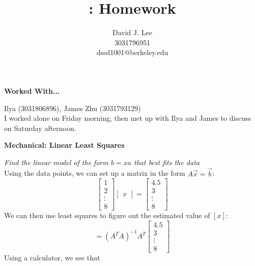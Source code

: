 \documentclass[letter]{article}
\title{\class: Homework \hwn}
\author{David J. Lee\\3031796951\\dssd1001@berkeley.edu}
\newenvironment{menumerate}{\edef\backupindent{\the\parindent}
  \enumerate\setlength{\parindent}{\backupindent}}
  {\endenumerate}
\begin{document}
\maketitle
\thispagestyle{empty}

\begin{menumerate}
    \item \textbf{Worked With...}

    Ilya (3031806896), James Zhu (3031793129)\\
    I worked alone on Friday morning, then met up with Ilya and James to discuss on Saturday afternoon.

    \newpage
    \item \textbf{Mechanical: Linear Least Squares}
    \begin{menumerate}
        \item \emph{Find the linear model of the form $b = xa$ that best fits the data}\\
        Using the data points, we can set up a matrix in the form $A\vec{x} = \vec{b}$:
        \begin{equation*}
            \begin{bmatrix}
                1\\2\\\vdots\\8
            \end{bmatrix}
            \begin{bmatrix}
                x
            \end{bmatrix}
            =
            \begin{bmatrix}
                4.5\\3\\\vdots\\8
            \end{bmatrix}
        \end{equation*}
        We can then use least squares to figure out the estimated value of $[x]$:
        \begin{equation*}
            [x] = (A^TA)^{-1}A^T
            \begin{bmatrix}
                4.5\\3\\\vdots\\8
            \end{bmatrix}
        \end{equation*}
        Using a calculator, we see that
        \begin{equation*}
            \begin{aligned}

\end{aligned}
\end{equation*}
\end{menumerate}
\end{menumerate}
\end{document}
